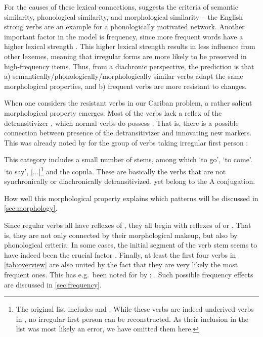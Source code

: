 For the causes of these lexical connections, \textcite[118]{bybee1985morphology} suggests the criteria of semantic similarity, phonological similarity, and morphological similarity -- the English strong verbs are an example for a phonologically motivated network.
Another important factor in the model is frequency, since more frequent words have a higher lexical strength \parencite[119]{bybee1985morphology}.
This higher lexical strength results in less influence from other lexemes, meaning that irregular forms are more likely to be preserved in high-frequency items.
Thus, from a diachronic perspective, the prediction is that a) semantically\slash{}phonologically\slash\hspace{0pt}morphologically similar verbs adapt the same morphological properties, and b) frequent verbs are more resistant to changes.

When one considers the resistant verbs in our Cariban problem, a rather salient morphological property emerges:
Most of the verbs lack a reflex of the detransitivizer \detrz, which normal  verbs do possess .
That is, there is a possible connection between presence of the detransitivizer and innovating new  markers.
This was already noted by \textcite{meira1998proto} for the group of \PTar verbs taking irregular first person :
\begin{quotebox}{\parencite[112]{meira1998proto}}
	This category includes a small number of stems, among which ‘to go’, ‘to come’. ‘to say’, [...]\footnote{The original list includes  and . While these verbs are indeed underived  verbs in \trio, no irregular first person  can be reconstructed. As their inclusion in the list was most likely an error, we have omitted them here.} and the copula. These are basically the verbs that are not synchronically or diachronically detransitivized. yet belong to the A conjugation.
\end{quotebox} %
How well this morphological property explains which patterns will be discussed in \cref{sec:morphology}.

Since regular  verbs all have reflexes of \detrz, they all begin with reflexes of  or .
That is, they are not only connected by their morphological makeup, but also by phonological criteria.
In some cases, the initial segment of the verb stem seems to have indeed been the crucial factor .
Finally, at least the first four verbs in \cref{tab:overview} are also united by the fact that they are very likely the most frequent ones.
This has e.g.\ been noted for \kalina by \textcite[75]{courtz2008carib}: .
Such possible frequency effects are discussed in \cref{sec:frequency}.

